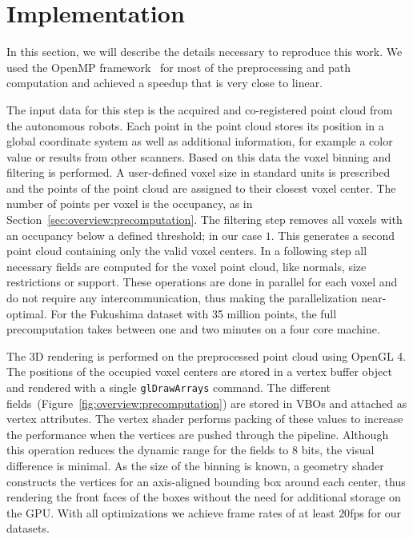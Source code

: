 \section{Implementation} \label{sec:implementation}

In this section, we will describe the details necessary to reproduce this work. We used the OpenMP framework~\cite{660313} for most of the preprocessing and path computation and achieved a speedup that is very close to linear.

 The input data for this step is the acquired and co-registered point cloud from the autonomous robots. Each point in the point cloud stores its position in a global coordinate system as well as additional information, for example a color value or results from other scanners. Based on this data the voxel binning and filtering is performed. A user-defined voxel size in standard units is prescribed and the points of the point cloud are assigned to their closest voxel center. The number of points per voxel is the occupancy, as in Section~\ref{sec:overview:precomputation}. The filtering step removes all voxels with an occupancy below a defined threshold; in our case $1$. This generates a second point cloud containing only the valid voxel centers. In a following step all necessary fields are computed for the voxel point cloud, like normals, size restrictions or support. These operations are done in parallel for each voxel and do not require any intercommunication, thus making the parallelization near-optimal. For the Fukushima dataset with 35 million points, the full precomputation takes between one and two minutes on a four core machine.

 The 3D rendering is performed on the preprocessed point cloud using OpenGL 4. The positions of the occupied voxel centers are stored in a vertex buffer object and rendered with a single \texttt{glDrawArrays} command. The different fields~(Figure~\ref{fig:overview:precomputation}) are stored in VBOs and attached as vertex attributes. The vertex shader performs packing of these values to increase the performance when the vertices are pushed through the pipeline. Although this operation reduces the dynamic range for the fields to 8 bits, the visual difference is minimal. As the size of the binning is known, a geometry shader constructs the vertices for an axis-aligned bounding box around each center, thus rendering the front faces of the boxes without the need for additional storage on the GPU. With all optimizations we achieve frame rates of at least $20$fps for our datasets.

